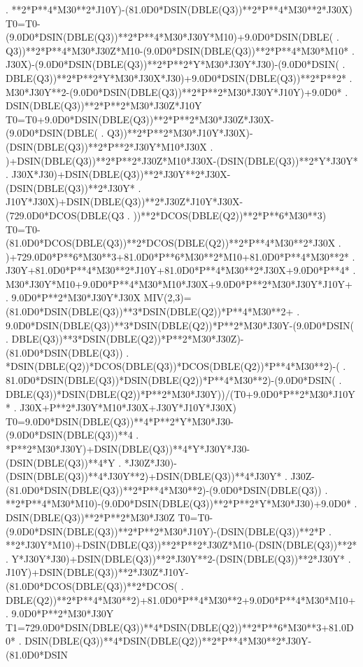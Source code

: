 \begin{framedverbatim}
     . **2*P**4*M30**2*J10Y)-(81.0D0*DSIN(DBLE(Q3))**2*P**4*M30**2*J30X)
      T0=T0-(9.0D0*DSIN(DBLE(Q3))**2*P**4*M30*J30Y*M10)+9.0D0*DSIN(DBLE(
     . Q3))**2*P**4*M30*J30Z*M10-(9.0D0*DSIN(DBLE(Q3))**2*P**4*M30*M10*
     . J30X)-(9.0D0*DSIN(DBLE(Q3))**2*P**2*Y*M30*J30Y*J30)-(9.0D0*DSIN(
     . DBLE(Q3))**2*P**2*Y*M30*J30X*J30)+9.0D0*DSIN(DBLE(Q3))**2*P**2*
     . M30*J30Y**2-(9.0D0*DSIN(DBLE(Q3))**2*P**2*M30*J30Y*J10Y)+9.0D0*
     . DSIN(DBLE(Q3))**2*P**2*M30*J30Z*J10Y
      T0=T0+9.0D0*DSIN(DBLE(Q3))**2*P**2*M30*J30Z*J30X-(9.0D0*DSIN(DBLE(
     . Q3))**2*P**2*M30*J10Y*J30X)-(DSIN(DBLE(Q3))**2*P**2*J30Y*M10*J30X
     . )+DSIN(DBLE(Q3))**2*P**2*J30Z*M10*J30X-(DSIN(DBLE(Q3))**2*Y*J30Y*
     . J30X*J30)+DSIN(DBLE(Q3))**2*J30Y**2*J30X-(DSIN(DBLE(Q3))**2*J30Y*
     . J10Y*J30X)+DSIN(DBLE(Q3))**2*J30Z*J10Y*J30X-(729.0D0*DCOS(DBLE(Q3
     . ))**2*DCOS(DBLE(Q2))**2*P**6*M30**3)
      T0=T0-(81.0D0*DCOS(DBLE(Q3))**2*DCOS(DBLE(Q2))**2*P**4*M30**2*J30X
     . )+729.0D0*P**6*M30**3+81.0D0*P**6*M30**2*M10+81.0D0*P**4*M30**2*
     . J30Y+81.0D0*P**4*M30**2*J10Y+81.0D0*P**4*M30**2*J30X+9.0D0*P**4*
     . M30*J30Y*M10+9.0D0*P**4*M30*M10*J30X+9.0D0*P**2*M30*J30Y*J10Y+
     . 9.0D0*P**2*M30*J30Y*J30X
      MIV(2,3)=(81.0D0*DSIN(DBLE(Q3))**3*DSIN(DBLE(Q2))*P**4*M30**2+
     . 9.0D0*DSIN(DBLE(Q3))**3*DSIN(DBLE(Q2))*P**2*M30*J30Y-(9.0D0*DSIN(
     . DBLE(Q3))**3*DSIN(DBLE(Q2))*P**2*M30*J30Z)-(81.0D0*DSIN(DBLE(Q3))
     . *DSIN(DBLE(Q2))*DCOS(DBLE(Q3))*DCOS(DBLE(Q2))*P**4*M30**2)-(
     . 81.0D0*DSIN(DBLE(Q3))*DSIN(DBLE(Q2))*P**4*M30**2)-(9.0D0*DSIN(
     . DBLE(Q3))*DSIN(DBLE(Q2))*P**2*M30*J30Y))/(T0+9.0D0*P**2*M30*J10Y*
     . J30X+P**2*J30Y*M10*J30X+J30Y*J10Y*J30X)
      T0=9.0D0*DSIN(DBLE(Q3))**4*P**2*Y*M30*J30-(9.0D0*DSIN(DBLE(Q3))**4
     . *P**2*M30*J30Y)+DSIN(DBLE(Q3))**4*Y*J30Y*J30-(DSIN(DBLE(Q3))**4*Y
     . *J30Z*J30)-(DSIN(DBLE(Q3))**4*J30Y**2)+DSIN(DBLE(Q3))**4*J30Y*
     . J30Z-(81.0D0*DSIN(DBLE(Q3))**2*P**4*M30**2)-(9.0D0*DSIN(DBLE(Q3))
     . **2*P**4*M30*M10)-(9.0D0*DSIN(DBLE(Q3))**2*P**2*Y*M30*J30)+9.0D0*
     . DSIN(DBLE(Q3))**2*P**2*M30*J30Z
      T0=T0-(9.0D0*DSIN(DBLE(Q3))**2*P**2*M30*J10Y)-(DSIN(DBLE(Q3))**2*P
     . **2*J30Y*M10)+DSIN(DBLE(Q3))**2*P**2*J30Z*M10-(DSIN(DBLE(Q3))**2*
     . Y*J30Y*J30)+DSIN(DBLE(Q3))**2*J30Y**2-(DSIN(DBLE(Q3))**2*J30Y*
     . J10Y)+DSIN(DBLE(Q3))**2*J30Z*J10Y-(81.0D0*DCOS(DBLE(Q3))**2*DCOS(
     . DBLE(Q2))**2*P**4*M30**2)+81.0D0*P**4*M30**2+9.0D0*P**4*M30*M10+
     . 9.0D0*P**2*M30*J30Y
      T1=729.0D0*DSIN(DBLE(Q3))**4*DSIN(DBLE(Q2))**2*P**6*M30**3+81.0D0*
     . DSIN(DBLE(Q3))**4*DSIN(DBLE(Q2))**2*P**4*M30**2*J30Y-(81.0D0*DSIN

\end{framedverbatim}
